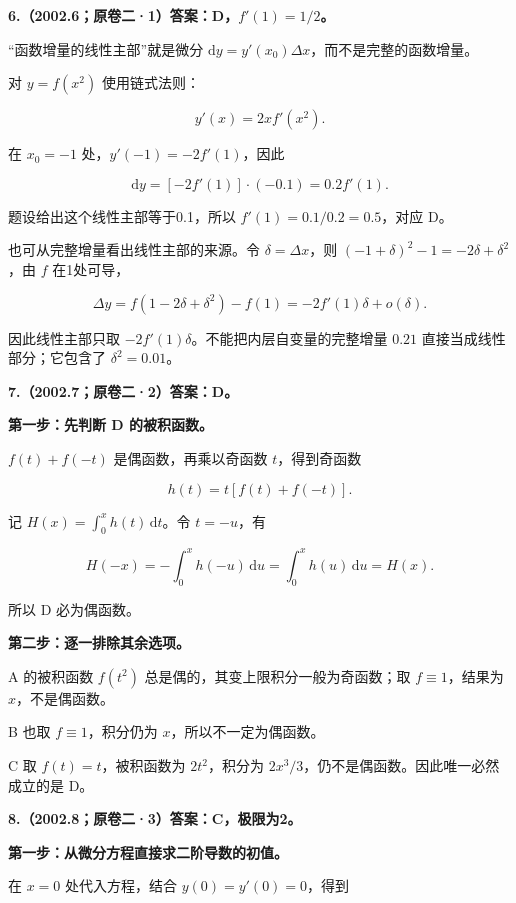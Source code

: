 \documentclass[UTF8,11pt,fontset=windows]{ctexart}
\begin{document}
\textbf{6.（2002.6；原卷二·1）答案：D，$f'(1)=1/2$。}

“函数增量的线性主部”就是微分 $\mathrm dy=y'(x_0)\Delta x$，而不是完整的函数增量。

对 $y=f(x^2)$ 使用链式法则：

$$
y'(x)=2x f'(x^2).
$$

在 $x_0=-1$ 处，$y'(-1)=-2f'(1)$，因此

$$
\mathrm dy=[-2f'(1)]\cdot(-0.1)=0.2f'(1).
$$

题设给出这个线性主部等于0.1，所以 $f'(1)=0.1/0.2=0.5$，对应 D。

也可从完整增量看出线性主部的来源。令 $\delta=\Delta x$，则 $(-1+\delta)^2-1=-2\delta+\delta^2$，由 $f$ 在1处可导，

$$
\Delta y=f(1-2\delta+\delta^2)-f(1)
=-2f'(1)\delta+o(\delta).
$$

因此线性主部只取 $-2f'(1)\delta$。不能把内层自变量的完整增量 $0.21$ 直接当成线性部分；它包含了 $\delta^2=0.01$。

\clearpage

\textbf{7.（2002.7；原卷二·2）答案：D。}

\textbf{第一步：先判断 D 的被积函数。}

$f(t)+f(-t)$ 是偶函数，再乘以奇函数 $t$，得到奇函数

$$
h(t)=t[f(t)+f(-t)].
$$

记 $H(x)=\int_0^x h(t)\,\mathrm dt$。令 $t=-u$，有

$$
H(-x)=-\int_0^x h(-u)\,\mathrm du=\int_0^x h(u)\,\mathrm du=H(x).
$$

所以 D 必为偶函数。

\textbf{第二步：逐一排除其余选项。}

A 的被积函数 $f(t^2)$ 总是偶的，其变上限积分一般为奇函数；取 $f\equiv1$，结果为 $x$，不是偶函数。

B 也取 $f\equiv1$，积分仍为 $x$，所以不一定为偶函数。

C 取 $f(t)=t$，被积函数为 $2t^2$，积分为 $2x^3/3$，仍不是偶函数。因此唯一必然成立的是 D。

\clearpage

\textbf{8.（2002.8；原卷二·3）答案：C，极限为2。}

\textbf{第一步：从微分方程直接求二阶导数的初值。}

在 $x=0$ 处代入方程，结合 $y(0)=y'(0)=0$，得到
\end{document}
